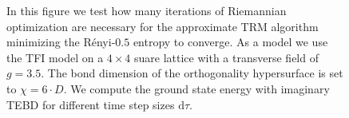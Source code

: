 \begin{figure}
\begin{minipage}{1.0\textwidth}
%
	\end{minipage}
	\caption{In this figure we test how many iterations of Riemannian optimization are necessary for the approximate TRM algorithm minimizing the Rényi-$0.5$ entropy to converge. As a model we use the TFI model on a $4\times4$ suare lattice with a transverse field of $g = 3.5$. The bond dimension of the orthogonality hypersurface is set to $\chi=6\cdot D$. We compute the ground state energy with imaginary TEBD for different time step sizes $\text{d}\tau$.}
	\label{fig:tfi_gs_energy_vs_dtau_different_N_iters}
\end{figure}